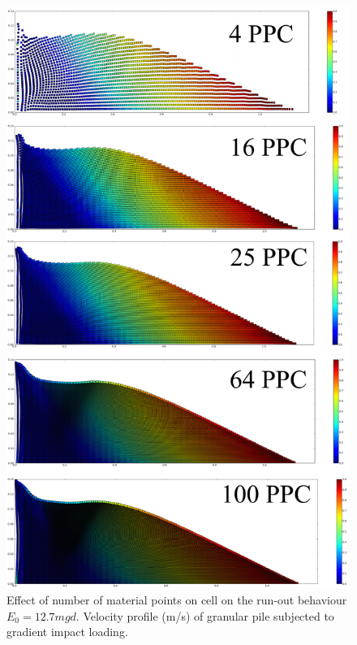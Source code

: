 \begin{figure}[tbhp]
\centering
\includegraphics[height=\textheight]{MPM_50ppc}
\caption{Effect of number of material points on cell on the run-out behaviour 
$E_0=12.7mgd$. 
Velocity profile (\si{\m/\s}) of granular pile subjected to gradient impact 
loading.}
\label{fig:MPM_50ppc}
\end{figure}


